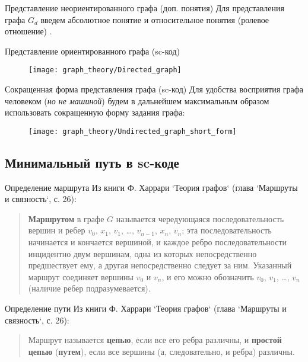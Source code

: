 \begin{frame}{Представление неориентированного графа (доп. понятия)}
  Для представления графа $G_d$ введем абсолютное понятие
   и относительное понятия (ролевое отношение)
  .
\end{frame}

\begin{frame}{Представление ориентированного графа (sc-код)}
  \begin{figure}
    \centering
    \texttt{[image: graph\_theory/Directed\_graph]}
  \end{figure}
\end{frame}

\begin{frame}{Сокращенная форма представления графа (sc-код)}
  Для удобства восприятия графа человеком (\emph{но не машиной})
  будем в дальнейшем максимальным образом использовать сокращенную
  форму задания графа:
  
  \begin{figure}
    \centering
    \texttt{[image: graph\_theory/Undirected\_graph\_short\_form]}
  \end{figure}
\end{frame}

\subsection{Минимальный путь в sc-коде}

\begin{frame}{Определение маршрута}
  Из книги Ф. Харрари `Теория графов` (глава `Маршруты и связность`, с. 26):
  \begin{quote}
    \textbf{Маршрутом} в графе $G$ называется чередующаяся последовательность
    вершин и ребер $v_0$, $x_1$, $v_1$, …, $v_{n-1}$, $x_n$, $v_n$; эта последовательность
    начинается и кончается вершиной, и каждое ребро последовательности
    инцидентно двум вершинам, одна из которых непосредственно
    предшествует ему, а другая непосредственно следует за
    ним. Указанный маршрут соединяет вершины $v_0$ и $v_n$, и его можно
    обозначить $v_0$, $v_1$, …, $v_n$ (наличие ребер подразумевается).
  \end{quote}
\end{frame}

\begin{frame}{Определение пути}
  Из книги Ф. Харрари `Теория графов` (глава `Маршруты и связность`, с. 26):
  \begin{quote}
    Маршрут называется \textbf{цепью}, если все его ребра различны, и
    \textbf{простой цепью} (\textbf{путем}), если все вершины (а,
    следовательно, и ребра) различны.
  \end{quote}
\end{frame}

